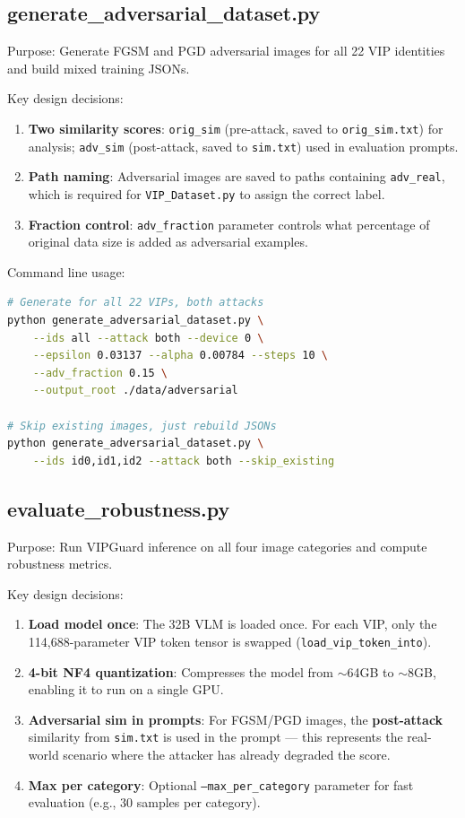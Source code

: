 \documentclass[12pt,a4paper]{article}
\begin{document}
\subsection{generate\_adversarial\_dataset.py}

Purpose: Generate FGSM and PGD adversarial images for all 22 VIP identities and build mixed training JSONs.

Key design decisions:
\begin{enumerate}
    \item \textbf{Two similarity scores}: \texttt{orig\_sim} (pre-attack, saved to \texttt{orig\_sim.txt}) for analysis; \texttt{adv\_sim} (post-attack, saved to \texttt{sim.txt}) used in evaluation prompts.
    \item \textbf{Path naming}: Adversarial images are saved to paths containing \texttt{adv\_real}, which is required for \texttt{VIP\_Dataset.py} to assign the correct label.
    \item \textbf{Fraction control}: \texttt{adv\_fraction} parameter controls what percentage of original data size is added as adversarial examples.
\end{enumerate}

Command line usage:
\begin{lstlisting}[language=bash,caption={generate\_adversarial\_dataset.py usage}]
# Generate for all 22 VIPs, both attacks
python generate_adversarial_dataset.py \
    --ids all --attack both --device 0 \
    --epsilon 0.03137 --alpha 0.00784 --steps 10 \
    --adv_fraction 0.15 \
    --output_root ./data/adversarial

# Skip existing images, just rebuild JSONs
python generate_adversarial_dataset.py \
    --ids id0,id1,id2 --attack both --skip_existing
\end{lstlisting}

\subsection{evaluate\_robustness.py}

Purpose: Run VIPGuard inference on all four image categories and compute robustness metrics.

Key design decisions:
\begin{enumerate}
    \item \textbf{Load model once}: The 32B VLM is loaded once. For each VIP, only the 114,688-parameter VIP token tensor is swapped (\texttt{load\_vip\_token\_into}).
    \item \textbf{4-bit NF4 quantization}: Compresses the model from $\sim$64GB to $\sim$8GB, enabling it to run on a single GPU.
    \item \textbf{Adversarial sim in prompts}: For FGSM/PGD images, the \textbf{post-attack} similarity from \texttt{sim.txt} is used in the prompt --- this represents the real-world scenario where the attacker has already degraded the score.
    \item \textbf{Max per category}: Optional \texttt{--max\_per\_category} parameter for fast evaluation (e.g., 30 samples per category).
\end{enumerate}
\end{document}
